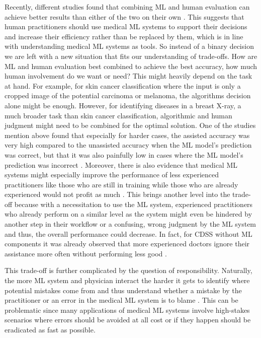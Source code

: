Recently, different studies found that combining ML and human evaluation can achieve better results than either of the two on their own \cite{rajpurkar2022ai, kiani2020impact, topol2019high, steiner2018impact}. This suggests that human practitioners should use medical ML systems to support their decisions and increase their efficiency rather than be replaced by them, which is in line with understanding medical ML systems as tools. So instead of a binary decision we are left with a new situation that fits our understanding of trade-offs. How are ML and human evaluation best combined to achieve the best accuracy, how much human involvement do we want or need? This might heavily depend on the task at hand. For example, for skin cancer classification where the input is only a cropped image of the potential carcinoma or melanoma, the algorithms decision alone might be enough. However, for identifying diseases in a breast X-ray, a much broader task than skin cancer classification, algorithmic and human judgment might need to be combined for the optimal solution.  One of the studies mention above found that especially for harder cases, the assisted accuracy was very high compared to the unassisted accuracy when the ML model's prediction was correct, but that it was also painfully low in cases where the ML model's prediction was incorrect \cite{kiani2020impact}. Moreover, there is also evidence that medical ML systems might especially improve the performance of less experienced practitioners like those who are still in training while those who are already experienced would not profit as much \cite{rajpurkar2022ai}. This brings another level into the trade-off because with a necessitation to use the ML system, experienced practitioners who already perform on a similar level as the system might even be hindered by another step in their workflow or a confusing, wrong judgment by the ML system and thus, the overall performance could decrease. In fact, for CDSS without ML components it was already observed that more experienced doctors ignore their assistance more often without performing less good \cite{sutton2020overview}.

This trade-off is further complicated by the question of responsibility. Naturally, the more ML system and physician interact the harder it gets to identify where potential mistakes come from and thus understand whether a mistake by the practitioner or an error in the medical ML system is to blame \cite{horgan2019artificial}. This can be problematic since many applications of medical ML systems involve high-stakes scenarios where errors should be avoided at all cost or if they happen should be eradicated as fast as possible.

